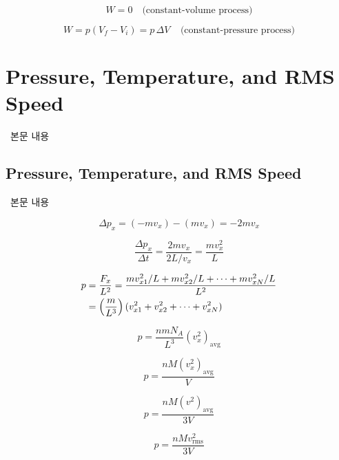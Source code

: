 \begin{equation} W = 0 \quad \text{(constant-volume process)} \end{equation}

\begin{equation} W = p(V_f - V_i) = p\, \Delta V ~~~~~ \text{(constant-pressure process)} \end{equation}

\section{Pressure, Temperature, and RMS Speed}
%
\ 본문 내용

\subsection{Pressure, Temperature, and RMS Speed}
%
\ 본문 내용

\begin{equation*} \Delta p_x = (-mv_x) - (mv_x) = -2mv_x \end{equation*}

\begin{equation*} \frac{\Delta p_x}{\Delta t} = \frac{2mv_x}{2L/v_x} = \frac{mv_x^2}{L} \end{equation*}

\begin{align}
    p&= \frac{F_x}{L^2} = \frac{mv_{x1}^2 / L + mv_{x2}^2 / L + \cdots + mv_{xN}^2 / L}{L^2} \notag \\
    &= \left( \frac{m}{L^3} \right)(v_{x1}^2 + v_{x2}^2 + \cdots + v_{xN}^2)
\end{align}

\begin{equation*} p = \frac{nmN_A}{L^3} \left( v_x^2 \right)_{\text{avg}} \end{equation*}

\begin{equation} p = \frac{nM (v_x^2)_{\text{avg}}}{V} \end{equation}

\begin{equation} p = \frac{nM (v^2)_{\text{avg}}}{3V} \end{equation}

\begin{equation} p = \frac{nM v_{\text{rms}}^2}{3V} \end{equation}

